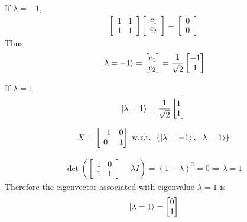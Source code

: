 If $\lambda = -1$,
\begin{align*}
	\begin{bmatrix}
		1 & 1 \\
		1 & 1
	\end{bmatrix}
	\begin{bmatrix}
		c_1 \\
		c_2
	\end{bmatrix} =
	\begin{bmatrix}
		0 \\
		0
	\end{bmatrix}
\end{align*}
Thus
\begin{align*}
	\ket{\lambda = -1} = \begin{bmatrix}
	c_1 \\
	c_2
	\end{bmatrix} = \frac{1}{\sqrt{2}}
	\begin{bmatrix}
	-1 \\
	1
	\end{bmatrix}
\end{align*}

If $\lambda = 1$
\begin{align*}
	\ket{\lambda = 1} = \frac{1}{\sqrt{2}}
	\begin{bmatrix}
	1 \\
	1
	\end{bmatrix}
\end{align*}

\begin{align*}
	X = \begin{bmatrix}
	-1 & 0 \\
	0 & 1
	\end{bmatrix}
	\text{ w.r.t. } \left\{ \ket{\lambda = -1},\ \ket{\lambda = 1}\right\}
\end{align*}



\begin{align*}
	\det \left(\begin{bmatrix}
	1 & 0 \\
	1 & 1
	\end{bmatrix} - \lambda I \right) = (1 - \lambda)^2 = 0 \Rightarrow \lambda = 1
\end{align*}
Therefore the eigenvector associated with eigenvalue $\lambda = 1$ is
\begin{align*}
	\ket{\lambda = 1} = \begin{bmatrix}
	0 \\
	1
	\end{bmatrix}
\end{align*}

